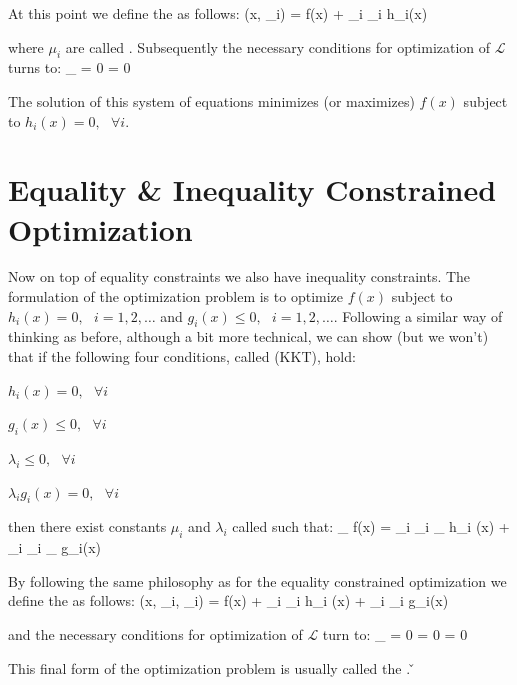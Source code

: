 At this point we define the  as follows:
\bse
{}(x, \mu_{i}) = f(x) + \sum_{i} \mu_{i} h_{i}(x)
\ese

where $\mu_{i}$ are called . Subsequently the necessary conditions for optimization of $
\mathcal{L}$ turns to:
\bse
\nabla_{}  = 0 \:\:\:  \:\:\:  = 0
\ese

The solution of this system of equations minimizes (or maximizes) $f(x)$ subject to $h_{i}(x) = 0, \:\:\: \forall i$.

\section{Equality \& Inequality Constrained Optimization}

Now on top of equality constraints we also have inequality constraints. The formulation of the optimization problem
is to optimize $f(x)$ subject to $h_{i}(x) = 0, \:\:\: i=1,2,\ldots$ and $g_{i}(x) \leq 0, \:\:\: i=1,2,\ldots$.
Following a similar way of thinking as before, although a bit more technical, we can show (but we won't) that if the
following four conditions, called  (KKT), hold:
\bit
\item $h_{i}(x) = 0, \:\:\: \forall i$
\item $g_{i}(x) \leq 0, \:\:\: \forall i$
\item $\lambda_{i} \leq 0, \:\:\: \forall i$
\item $\lambda_{i} g_{i}(x) = 0, \:\:\: \forall i$
\eit

then there exist constants $\mu_{i}$ and $\lambda_{i}$ called  such that:
\bse
\nabla_{} f(x) =
\sum_{i} \mu_{i} \nabla_{} h_{i} (x) + \sum_{i} \lambda_{i} \nabla_{} g_{i}(x)
\ese

By following the same philosophy as for the equality constrained optimization we define the  as follows:
\bse
{}(x, \mu_{i}, \lambda_{i}) = f(x) + \sum_{i} \mu_{i} h_{i} (x) + \sum_{i} \lambda_{i} g_{i}(x)
\ese

and the necessary conditions for optimization of $ \mathcal{L}$ turn to:
\bse
\nabla_{} 
= 0 \:\:\:  \:\:\: 
= 0 \:\:\:  \:\:\: 
= 0
\ese

This final form of the optimization problem is usually called the . \v

